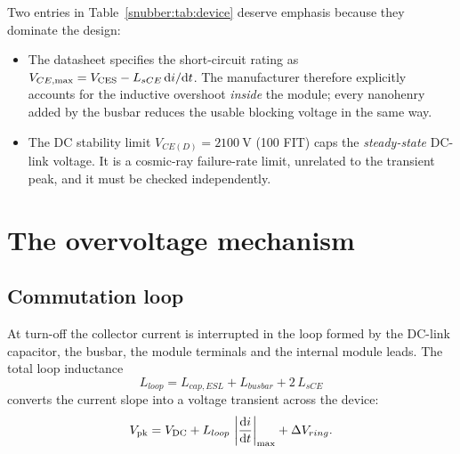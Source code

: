Two entries in Table~\ref{snubber:tab:device} deserve emphasis because they dominate
the design:

\begin{itemize}[nosep]
\item The datasheet specifies the short-circuit rating as
      $V_{CE,\max} = V_{\mathrm{CES}} - L_{sCE}\,\mathrm{d}i/\mathrm{d}t$. The
      manufacturer therefore explicitly accounts for the inductive overshoot
      \emph{inside} the module; every nanohenry added by the busbar reduces
      the usable blocking voltage in the same way.
\item The DC stability limit $V_{CE(D)} = \SI{2100}{\volt}$ (100 FIT) caps the
      \emph{steady-state} DC-link voltage. It is a cosmic-ray failure-rate
      limit, unrelated to the transient peak, and it must be checked
      independently.
\end{itemize}

\section{The overvoltage mechanism}

\subsection{Commutation loop}

At turn-off the collector current is interrupted in the loop formed by the
DC-link capacitor, the busbar, the module terminals and the internal module
leads. The total loop inductance
\begin{equation}
L_{loop} = L_{cap,ESL} + L_{busbar} + 2\,L_{sCE}
\label{snubber:eq:loop}
\end{equation}
converts the current slope into a voltage transient across the device:
\begin{equation}
V_{\mathrm{pk}} = V_{\mathrm{DC}} + L_{loop}\,\left|\frac{\mathrm{d}i}{\mathrm{d}t}\right|_{\max}
       + \Delta V_{ring}.
\label{snubber:eq:vpk}
\end{equation}

